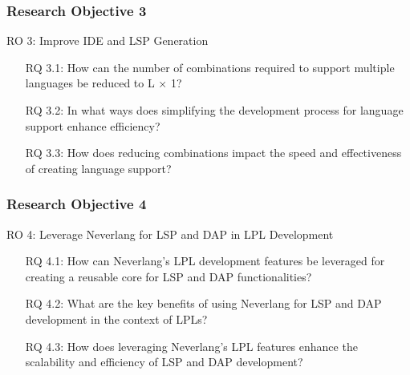 \documentclass[9pt,xcolor=table,svgnames]{beamer}
\begin{document}
\begin{frame}
    \frametitle{Research Objective 3}

    \begin{center}
       \large \alert{RO 3}:
       \normalsize Improve IDE and LSP Generation
       \bigskip
    \end{center}

    \begin{center}
    \begin{minipage}{0.75\textwidth}
    \begin{itemize}
        \item[RQ 3.1:] How can the number of combinations required to support multiple languages be reduced to L × 1?
        \item[RQ 3.2:] In what ways does simplifying the development process for language support enhance efficiency?
        \item[RQ 3.3:] How does reducing combinations impact the speed and effectiveness of creating language support?
    \end{itemize}
    \end{minipage}
    \end{center}
\end{frame}

\begin{frame}
    \frametitle{Research Objective 4}

    \begin{center}
       \large \alert{RO 4}:
       \normalsize Leverage Neverlang for LSP and DAP in LPL Development
       \bigskip
    \end{center}

    \begin{center}
    \begin{minipage}{0.75\textwidth}
    \begin{itemize}
        \item[RQ 4.1:] How can Neverlang’s LPL development features be leveraged for creating a reusable core for LSP and DAP functionalities?
        \item[RQ 4.2:] What are the key benefits of using Neverlang for LSP and DAP development in the context of LPLs?
        \item[RQ 4.3:] How does leveraging Neverlang’s LPL features enhance the scalability and efficiency of LSP and DAP development?
    \end{itemize}
    \end{minipage}
    \end{center}
\end{frame}
\end{document}
